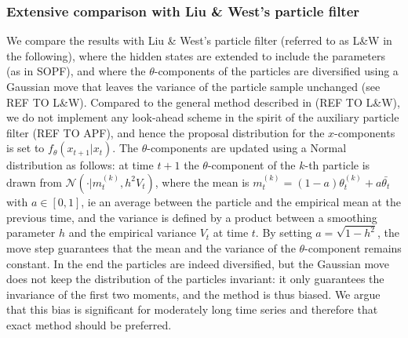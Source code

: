 \documentclass{statsoc}
\begin{document}
\subsubsection{Extensive comparison with Liu \& West's particle filter}

We compare the results with Liu \& West's particle filter (referred to as L\&W in the following), where the hidden states are extended to include the parameters (as in SOPF), and where the $\theta$-components of the particles are diversified using a Gaussian move that leaves the variance of the particle sample unchanged (see REF TO L\&W). Compared to the general method described in
(REF TO L\&W), we do not implement any look-ahead scheme in the spirit of the auxiliary particle filter (REF TO APF), and hence
the proposal distribution for the $x$-components is set to $f_\theta(x_{t+1}\vert x_t)$. The $\theta$-components are updated using a Normal distribution as follows: at time $t+1$ the $\theta$-component of the $k$-th particle 
is drawn from $\mathcal{N}(\cdot \vert m^{(k)}_t, h^2 V_t)$, where the mean is $m^{(k)}_t = (1 - a) \theta_t^{(k)} + a \bar{\theta_t}$ with $a\in [0,1]$, ie an average between the particle and the empirical mean at the previous time, and the variance is defined by a product between
a smoothing parameter $h$ and the empirical variance $V_t$ at time $t$. By setting $a = \sqrt{1 - h^2}$, the
move step guarantees that the mean and the variance of the $\theta$-component remains constant. In the end the particles are indeed diversified, but the Gaussian move does not keep the distribution of the particles invariant:
it only guarantees the invariance of the first two moments, and the method is thus biased. We argue that this bias is significant for moderately long time series and therefore that exact method should be preferred.
\end{document}
